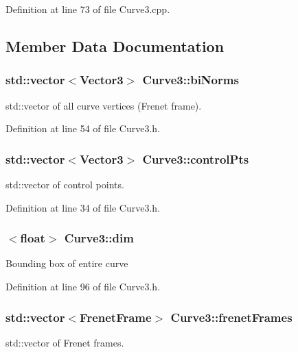 Definition at line 73 of file Curve3.\-cpp.



\subsection{Member Data Documentation}
\hypertarget{class_curve3_a32046ec84335f78317dab2dccbeb732e}{
\subsubsection[{bi\-Norms}]{\setlength{\rightskip}{0pt plus 5cm}std\-::vector$<${\bf Vector3}$>$ Curve3\-::bi\-Norms\hspace{0.3cm}{\ttfamily [protected]}}}\label{class_curve3_a32046ec84335f78317dab2dccbeb732e}
std\-::vector of all curve vertices (Frenet frame). 

Definition at line 54 of file Curve3.\-h.

\hypertarget{class_curve3_a2e9e6cfb4a03fffea0b4adbec17bba80}{
\subsubsection[{control\-Pts}]{\setlength{\rightskip}{0pt plus 5cm}std\-::vector$<${\bf Vector3}$>$ Curve3\-::control\-Pts\hspace{0.3cm}{\ttfamily [protected]}}}\label{class_curve3_a2e9e6cfb4a03fffea0b4adbec17bba80}
std\-::vector of control points. 

Definition at line 34 of file Curve3.\-h.

\hypertarget{class_curve3_ad2c2f60f7e9c11e87353cb9e6653f1e1}{
\subsubsection[{dim}]{$<$float$>$ Curve3\-::dim\hspace{0.3cm}{\ttfamily [protected]}}}\label{class_curve3_ad2c2f60f7e9c11e87353cb9e6653f1e1}
Bounding box of entire curve 

Definition at line 96 of file Curve3.\-h.

\hypertarget{class_curve3_a6dbfbfd7fd486988ca2d08ddd65b7f68}{
\subsubsection[{frenet\-Frames}]{\setlength{\rightskip}{0pt plus 5cm}std\-::vector$<${\bf Frenet\-Frame}$>$ Curve3\-::frenet\-Frames\hspace{0.3cm}{\ttfamily [protected]}}}\label{class_curve3_a6dbfbfd7fd486988ca2d08ddd65b7f68}
std\-::vector of Frenet frames. 

